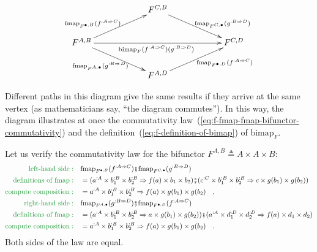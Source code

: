 \begin{wrapfigure}{l}{0.5\columnwidth}%
\vspace{-1.5\baselineskip}
\[
\xymatrix{\xyScaleY{2.0pc}\xyScaleX{5.0pc} & F^{C,B}\ar[rd]\sp(0.6){\ ~~\text{fmap}_{F^{C,\bullet}}(g^{:B\Rightarrow D})}\\
F^{A,B}\ar[ru]\sp(0.4){\text{fmap}_{F^{\bullet,B}}(f^{:A\Rightarrow C})~~~}\ar[rd]\sb(0.5){\text{fmap}_{F^{A,\bullet}}(g^{:B\Rightarrow D})~~\ }\ar[rr]\sb(0.5){\text{bimap}_{F}(f^{:A\Rightarrow C})(g^{:B\Rightarrow D})\ } &  & F^{C,D}\\
 & F^{A,D}\ar[ru]\sb(0.6){~~~~\text{fmap}_{F^{\bullet,D}}(f^{:A\Rightarrow C})}
}
\]

\vspace{-2.2\baselineskip}
\end{wrapfigure}%
Different paths in this diagram give the same results if they arrive
at the same vertex (as mathematicians say, ``the diagram commutes'').
In this way, the diagram illustrates at once the commutativity law~(\ref{eq:f-fmap-fmap-bifunctor-commutativity})
and the definition~(\ref{eq:f-definition-of-bimap}) of $\text{bimap}_{F}$.

Let us verify the commutativity law for the bifunctor $F^{A,B}\triangleq A\times A\times B$:
\begin{align*}
{\color{greenunder}\text{left-hand side}:}\quad & \text{fmap}_{F^{\bullet,B}}(f^{:A\Rightarrow C})\bef\text{fmap}_{F^{C,\bullet}}(g^{:B\Rightarrow D})\\
{\color{greenunder}\text{definitions of }\text{fmap}:}\quad & =(a^{:A}\times b_{1}^{:B}\times b_{2}^{:B}\Rightarrow f(a)\times b_{1}\times b_{2})\bef(c^{:C}\times b_{1}^{:B}\times b_{2}^{:B}\Rightarrow c\times g(b_{1})\times g(b_{2}))\\
{\color{greenunder}\text{compute composition}:}\quad & =a^{:A}\times b_{1}^{:B}\times b_{2}^{:B}\Rightarrow f(a)\times g(b_{1})\times g(b_{2})\quad,\\
{\color{greenunder}\text{right-hand side}:}\quad & \text{fmap}_{F^{A,\bullet}}(g^{:B\Rightarrow D})\bef\text{fmap}_{F^{\bullet,D}}(f^{:A\Rightarrow C})\\
{\color{greenunder}\text{definitions of }\text{fmap}:}\quad & =(a^{:A}\times b_{1}^{:B}\times b_{2}^{:B}\Rightarrow a\times g(b_{1})\times g(b_{2}))\bef(a^{:A}\times d_{1}^{:D}\times d_{2}^{:D}\Rightarrow f(a)\times d_{1}\times d_{2})\\
{\color{greenunder}\text{compute composition}:}\quad & =a^{:A}\times b_{1}^{:B}\times b_{2}^{:B}\Rightarrow f(a)\times g(b_{1})\times g(b_{2})\quad.
\end{align*}
Both sides of the law are equal.

